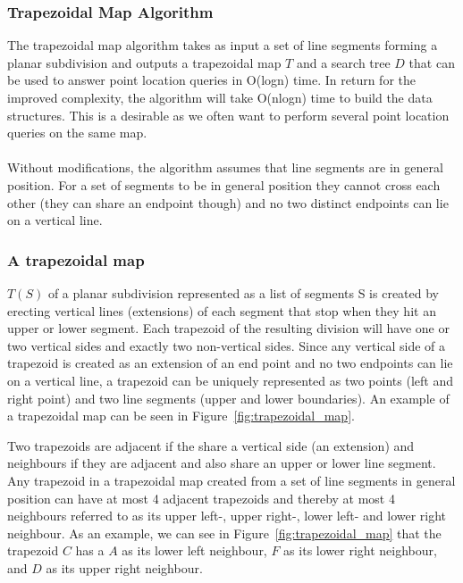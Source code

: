\subsubsection{Trapezoidal Map Algorithm}
The trapezoidal map algorithm takes as input a set of line segments forming a planar subdivision and outputs a trapezoidal map $T$ and a search tree $D$ that can be used to answer point location queries in O(logn) time. In return for the improved complexity, the algorithm will take O(nlogn) time to build the data structures. This is a desirable as we often want to perform several point location queries on the same map. 

\paragraph{}
Without modifications, the algorithm assumes that line segments are in general position. For a set of segments to be in general position they cannot cross each other (they can share an endpoint though) and no two distinct endpoints can lie on a vertical line.

\subsubsection{A trapezoidal map}
$T(S)$ of a planar subdivision represented as a list of segments S is created by erecting vertical lines (extensions) of each segment that stop when they hit an upper or lower segment. Each trapezoid of the resulting division will have one or two vertical sides and exactly two non-vertical sides. Since any vertical side of a trapezoid is created as an extension of an end point and no two endpoints can lie on a vertical line, a trapezoid can be uniquely represented as two points (left and right point) and two line segments (upper and lower boundaries). An example of a trapezoidal map can be seen in Figure~\ref{fig:trapezoidal_map}.

Two trapezoids are adjacent if the share a vertical side (an extension) and neighbours if they are adjacent and also share an upper or lower line segment. Any trapezoid in a trapezoidal map created from a set of line segments in general position can have at most 4 adjacent trapezoids and thereby at most 4 neighbours referred to as its upper left-, upper right-, lower left- and lower right neighbour. As an example, we can see in Figure~\ref{fig:trapezoidal_map} that the trapezoid $C$ has a $A$ as its lower left neighbour, $F$ as its lower right neighbour, and $D$ as its upper right neighbour.
